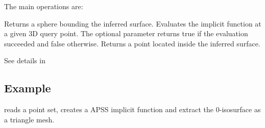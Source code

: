 The main operations are:

{
Returns a sphere bounding the inferred surface.
}
\ccGlue
{}
{
Evaluates the implicit function at a given 3D query point. The optional parameter  returns true if the evaluation succeeded and false otherwise.
}
\ccGlue
{}
{
Returns a point located inside the inferred surface.
}


See details in \\




\subsection{Example}

 reads a point set, creates a APSS implicit function and extract the $0$-isosurface as a triangle mesh.

